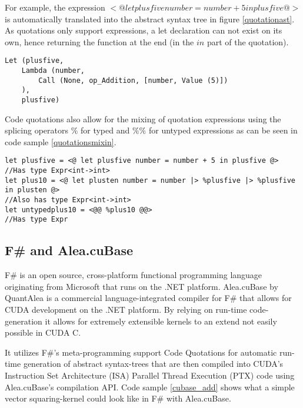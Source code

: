 {For example, the expression $<@ let plusfive number = number + 5 in plusfive @>$ is automatically translated into the abstract syntax tree in figure \ref{quotationast}. As quotations only support expressions, a let declaration can not exist on its own, hence returning the function at the end (in the $in$ part of the quotation).

\begin{lstlisting}[caption=Abstract syntax tree for the example quotation expression, label=quotationast]
Let (plusfive, 
	Lambda (number, 
		Call (None, op_Addition, [number, Value (5)])
	), 
	plusfive)
\end{lstlisting}

Code quotations also allow for the mixing of quotation expressions using the splicing operators $\%$ for typed and $\%\%$ for untyped expressions as can be seen in code sample \ref{quotationsmixin}.

\begin{lstlisting}[caption=Quotation mixing, label=quotationsmixin]
let plusfive = <@ let plusfive number = number + 5 in plusfive @>
//Has type Expr<int->int>
let plus10 = <@ let plusten number = number |> %plusfive |> %plusfive in plusten @>
//Also has type Expr<int->int>
let untypedplus10 = <@@ %plus10 @@>
//Has type Expr
\end{lstlisting}


\subsection{F\# and Alea.cuBase}
F\#\cite{fsharp} is an open source, cross-platform functional programming language originating from Microsoft that runs on the .NET platform.
Alea.cuBase by QuantAlea\cite{quantalea} is a commercial language-integrated compiler for F\# that allows for CUDA development on the .NET platform.
By relying on run-time code-generation it allows for extremely extensible kernels to an extend not easily possible in CUDA C.

It utilizes F\#'s meta-programming support Code Quotations for automatic run-time generation of abstract syntax-trees that are then compiled into CUDA's Instruction Set Architecture (ISA) Parallel Thread Execution (PTX) code using Alea.cuBase's compilation API.
Code sample \ref{cubase_add} shows what a simple vector squaring-kernel could look like in F\# with Alea.cuBase.

}
